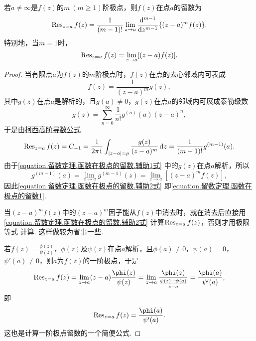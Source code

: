 \begin{property}
若\(a\neq\infty\)是\(f(z)\)的\(m\ (m\geq1)\)阶极点，则\(f(z)\)在点\(a\)的留数为\begin{equation}\label{equation.留数定理.函数在极点的留数1}
\operatorname{Res}_{z=a} f(z)
= \frac{1}{(m-1)!} \lim\limits_{z \to a} \dv[m-1]{z} \{ (z-a)^m f(z) \}.
\end{equation}
特别地，当\(m=1\)时，\begin{equation}\label{equation.留数定理.函数在极点的留数2}
\operatorname{Res}_{z=a} f(z)
= \lim\limits_{z \to a} [(z-a) f(z)].
\end{equation}
\begin{proof}
当有限点\(a\)为\(f(z)\)的\(m\)阶极点时，\(f(z)\)在点的去心邻域内可表成\begin{equation}\label{equation.留数定理.函数在极点的留数.辅助1式}
f(z) = \frac{1}{(z-a)^m} g(z),
\end{equation}
其中\(g(z)\)在点\(a\)是解析的，且\(g(a)\neq0\)，\(g(z)\)在点\(a\)的邻域内可展成泰勒级数\[
g(z) = \sum\limits_{n=0}^\infty \frac{1}{n!} g^{(n)}(a) (z-a)^n,
\]于是由\hyperref[equation:解析函数的积分表示.柯西高阶导数公式]{柯西高阶导数公式}\begin{equation}\label{equation.留数定理.函数在极点的留数.辅助2式}
\operatorname{Res}_{z=a} f(z) = C_{-1}
= \frac{1}{2\pi\kern1pt\mathrm{i}\kern1pt} \int_{\abs{z-a}=\rho} \frac{g(z)}{(z-a)^m} \dd{z}
= \frac{1}{(m-1)!} g^{(m-1)}(a).
\end{equation}由于\cref{equation.留数定理.函数在极点的留数.辅助1式} 中的\(g(z)\)在点\(a\)解析，所以\[
g^{(m-1)}(a) = \lim\limits_{z \to a} g^{(m-1)}(z)
= \lim\limits_{z \to a} [(z-a)^m f(z)],
\]因此\cref{equation.留数定理.函数在极点的留数.辅助2式} 即\cref{equation.留数定理.函数在极点的留数1}.

当\((z-a)^m f(z)\)中的\((z-a)^m\)因子能从\(f(z)\)中消去时，就在消去后直接用\cref{equation.留数定理.函数在极点的留数.辅助2式} 计算\(\operatorname{Res}_{z=a} f(z)\)，否则才用极限等式  计算.
这样做较为省事一些.

若\(f(z) = \frac{\phi(z)}{\psi(z)}\)，\(\phi(z)\)及\(\psi(z)\)在点\(a\)解析，且\(\phi(a)\neq0\)，\(\psi(a)=0\)，\(\psi'(a)\neq0\)，则\(a\)为\(f(z)\)的一阶极点，于是\[
\Res_{z=a} f(z)
= \lim\limits_{z \to a} (z-a) \frac{\phi(z)}{\psi(z)}
= \lim\limits_{z \to a} \frac{\phi(z)}{\frac{\psi(z)-\psi(a)}{z-a}}
= \frac{\phi(a)}{\psi'(a)},
\]即\begin{equation}\label{equation.留数定理.函数在极点的留数3}
\Res_{z=a} f(z)
= \frac{\phi(a)}{\psi'(a)}.
\end{equation}
这也是计算一阶极点留数的一个简便公式.
\end{proof}
\end{property}

